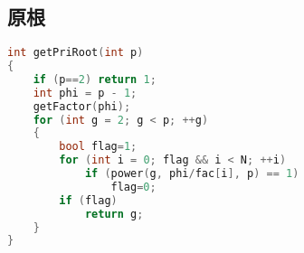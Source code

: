\subsection{原根}
    \begin{lstlisting}[language=c++]
int getPriRoot(int p)
{
    if (p==2) return 1;
    int phi = p - 1;
    getFactor(phi);
    for (int g = 2; g < p; ++g)
    {
        bool flag=1;
        for (int i = 0; flag && i < N; ++i)
            if (power(g, phi/fac[i], p) == 1)
                flag=0;
        if (flag)
            return g;
    }
}
    \end{lstlisting}